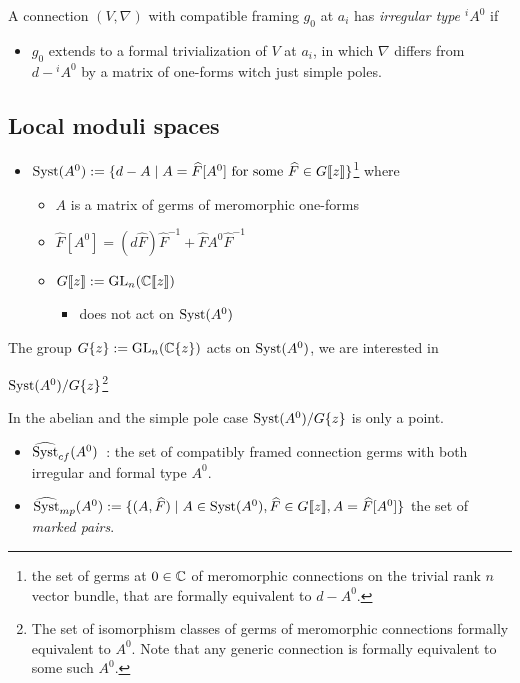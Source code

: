 \begin{defn}[2.4]
  A connection $(V,\nabla)$ with compatible framing $g_0$ at $a_i$ has
  \emph{irregular type ${}^iA^0$} if
  \begin{itemize}
    \item $g_0$ extends to a formal trivialization of $V$ at $a_i$, in which
    $\nabla$ differs from $d-{}^iA^0$ by a matrix of one-forms witch just
    simple poles.
  \end{itemize}
\end{defn}

\subsection{Local moduli spaces} %
\begin{defn}
  \begin{itemize}
    \item $\operatorname{Syst}(A^0):=\{d-A \mid A=\widehat{F}[A^0] \text{ for some } \widehat{F}\in
      G\llbracket z\rrbracket\}$\footnote{the set of germs at $0\in\mathbb{C}$ of
      meromorphic connections on the trivial rank $n$ vector bundle, that are
      formally equivalent to $d-A^0$.}
      where
      \begin{itemize}
        \item $A$ is a matrix of germs of meromorphic one-forms
        \item $\hat{F}[A^0]=(d\hat{F})\hat{F}^{-1}+\hat{F}A^0\hat{F}^{-1}$
        \item $G\llbracket z\rrbracket:=\operatorname{GL}_n(\mathbb{C}\llbracket z\rrbracket)$
          \begin{itemize}
            \item does not act on $\operatorname{Syst}(A^0)$
          \end{itemize}
      \end{itemize}
  \end{itemize}
  The group $G\{z\}:=\operatorname{GL}_n(\mathbb{C}\{z\})$ acts on $\operatorname{Syst}(A^0)$, we are interested
  in
  \begin{center}
    $\operatorname{Syst}(A^0)/G\{z\}$\footnote{The set of isomorphism classes of germs of
    meromorphic connections formally equivalent to $A^0$. Note that any
    generic connection is formally equivalent to some such $A^0$.}
  \end{center}
\end{defn}
\begin{rem}
  In the abelian and the simple pole case $\operatorname{Syst}(A^0)/G\{z\}$ is only a point.
\end{rem}
\begin{defn}
  \begin{itemize}
    \item $\widehat{\operatorname{Syst}}_{cf}(A^0)$~:\Leftrightarrow{} the set of compatibly
      framed connection germs with both irregular and formal type $A^0$.
    \item $\widehat{\operatorname{Syst}}_{mp}(A^0):=\{(A,\widehat{F})\mid A\in\operatorname{Syst}(A^0)
      ,\widehat{F}\in G\llbracket z\rrbracket
      ,A=\widehat{F}[A^0]\}$
      the set of \emph{marked pairs}.
  \end{itemize}
\end{defn}
